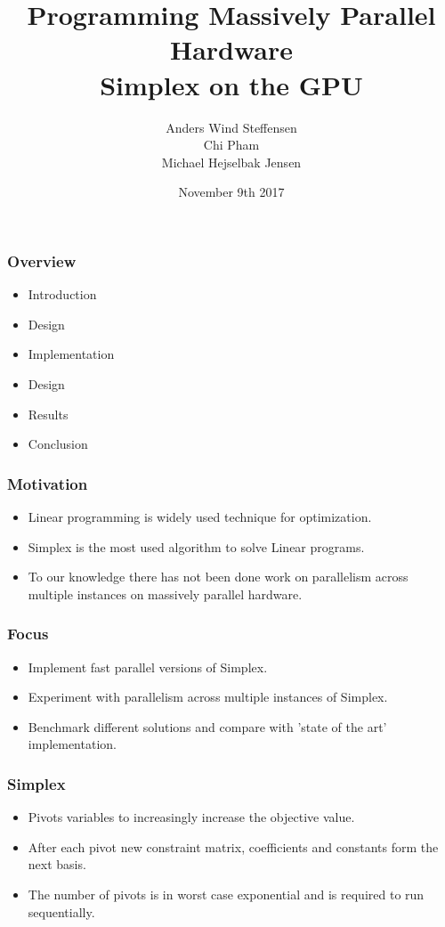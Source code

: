 \documentclass[handout]{beamer}
\title{Programming Massively Parallel Hardware\\\textbf{Simplex on the GPU}}
\author[]{%
  Anders Wind Steffensen \\
  Chi Pham \\
  Michael Hejselbak Jensen \\
}
\institute{Department of Computer Science (DIKU)\\University of Copenhagen}
\date[3/3]{November 9th 2017}
\begin{document}
\titleslide


\begin{frame}
  \frametitle{Overview}
  \begin{itemize}
  \item Introduction
  \item Design
  \item Implementation
  \item Design
  \item Results
  \item Conclusion
  \end{itemize}
\end{frame}


\begin{frame}
\frametitle{Motivation}
\begin{itemize}
	\item Linear programming is widely used technique for optimization.
	\item Simplex is the most used algorithm to solve Linear programs.
	\item To our knowledge there has not been done work on parallelism across multiple instances on massively parallel hardware.
\end{itemize}
\end{frame}

\begin{frame}
\frametitle{Focus}
\begin{itemize}
\item Implement fast parallel versions of Simplex.
\item Experiment with parallelism across multiple instances of Simplex.
\item Benchmark different solutions and compare with 'state of the art' implementation.
\end{itemize}
\end{frame}


\begin{frame}
\frametitle{Simplex}
\begin{itemize}
\item Pivots variables to increasingly increase the objective value.
\item After each pivot new constraint matrix, coefficients and constants form the next basis.
\item The number of pivots is in worst case exponential and is required to run sequentially.
\end{itemize}
\end{frame}
\end{document}
